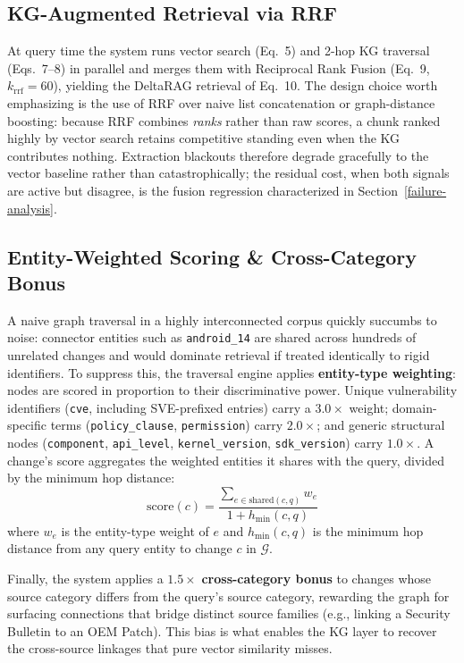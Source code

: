 \documentclass[
]{article}
\begin{document}
\subsection{KG-Augmented Retrieval via RRF}\label{graph-augmented-retrieval}

At query time the system runs vector search (Eq.~5) and 2-hop KG traversal
(Eqs.~7--8) in parallel and merges them with Reciprocal Rank Fusion
(Eq.~9, $k_{\mathrm{rrf}} = 60$), yielding the DeltaRAG retrieval of
Eq.~10. The design choice worth emphasizing is the use of RRF over naive
list concatenation or graph-distance boosting: because RRF combines
\emph{ranks} rather than raw scores, a chunk ranked highly by vector
search retains competitive standing even when the KG contributes nothing.
Extraction blackouts therefore degrade gracefully to the vector baseline
rather than catastrophically; the residual cost, when both signals are
active but disagree, is the fusion regression characterized in
Section~\ref{failure-analysis}.

\subsection{Entity-Weighted Scoring \& Cross-Category Bonus}\label{adaptive-retrieval-strategy-learning}

A naive graph traversal in a highly interconnected corpus quickly
succumbs to noise: connector entities such as \texttt{android\_14} are
shared across hundreds of unrelated changes and would dominate
retrieval if treated identically to rigid identifiers. To suppress this,
the traversal engine applies \textbf{entity-type weighting}: nodes are
scored in proportion to their discriminative power. Unique vulnerability
identifiers (\texttt{cve}, including SVE-prefixed entries) carry a
$3.0\times$ weight; domain-specific terms (\texttt{policy\_clause},
\texttt{permission}) carry $2.0\times$; and generic structural nodes
(\texttt{component}, \texttt{api\_level}, \texttt{kernel\_version},
\texttt{sdk\_version}) carry $1.0\times$. A change's score aggregates
the weighted entities it shares with the query, divided by the minimum
hop distance:
\begin{equation}
  \mathrm{score}(c) = \frac{\sum_{e \in \mathrm{shared}(c, q)} w_e}{1 + h_{\min}(c, q)}
\end{equation}
where $w_e$ is the entity-type weight of $e$ and $h_{\min}(c, q)$ is the
minimum hop distance from any query entity to change $c$ in $\mathcal{G}$.

Finally, the system applies a $1.5\times$ \textbf{cross-category bonus}
to changes whose source category differs from the query's source
category, rewarding the graph for surfacing connections that bridge
distinct source families (e.g., linking a Security Bulletin to an OEM
Patch). This bias is what enables the KG layer to recover the
cross-source linkages that pure vector similarity misses.
\end{document}
